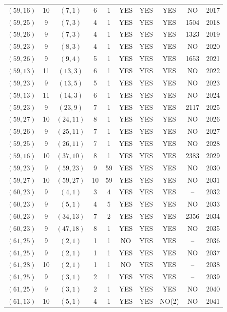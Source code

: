 \begin{longtable}{|c|c|c|c|c|c|c|c|c|c|}
$(59, 16)$ & 10 & $(7, 1)$ & 6 & 1 & YES & YES & YES & NO & 2017\\
$(59, 25)$ & 9 & $(7, 3)$ & 4 & 1 & YES & YES & YES & 1504 & 2018\\
$(59, 26)$ & 9 & $(7, 3)$ & 4 & 1 & YES & YES & YES & 1323 & 2019\\
$(59, 23)$ & 9 & $(8, 3)$ & 4 & 1 & YES & YES & YES & NO & 2020\\
$(59, 26)$ & 9 & $(9, 4)$ & 5 & 1 & YES & YES & YES & 1653 & 2021\\
$(59, 13)$ & 11 & $(13, 3)$ & 6 & 1 & YES & YES & YES & NO & 2022\\
$(59, 23)$ & 9 & $(13, 5)$ & 5 & 1 & YES & YES & YES & NO & 2023\\
$(59, 13)$ & 11 & $(14, 3)$ & 6 & 1 & YES & YES & YES & NO & 2024\\
$(59, 23)$ & 9 & $(23, 9)$ & 7 & 1 & YES & YES & YES & 2117 & 2025\\
$(59, 27)$ & 10 & $(24, 11)$ & 8 & 1 & YES & YES & YES & NO & 2026\\
$(59, 26)$ & 9 & $(25, 11)$ & 7 & 1 & YES & YES & YES & NO & 2027\\
$(59, 25)$ & 9 & $(26, 11)$ & 7 & 1 & YES & YES & YES & NO & 2028\\
$(59, 16)$ & 10 & $(37, 10)$ & 8 & 1 & YES & YES & YES & 2383 & 2029\\
$(59, 23)$ & 9 & $(59, 23)$ & 9 & 59 & YES & YES & YES & NO & 2030\\
$(59, 27)$ & 10 & $(59, 27)$ & 10 & 59 & YES & YES & YES & NO & 2031\\
$(60, 23)$ & 9 & $(4, 1)$ & 3 & 4 & YES & YES & YES & -- & 2032\\
$(60, 23)$ & 9 & $(5, 1)$ & 4 & 5 & YES & YES & YES & NO & 2033\\
$(60, 23)$ & 9 & $(34, 13)$ & 7 & 2 & YES & YES & YES & 2356 & 2034\\
$(60, 23)$ & 9 & $(47, 18)$ & 8 & 1 & YES & YES & YES & NO & 2035\\
$(61, 25)$ & 9 & $(2, 1)$ & 1 & 1 & NO & YES & YES & -- & 2036\\
$(61, 25)$ & 9 & $(2, 1)$ & 1 & 1 & YES & YES & YES & NO & 2037\\
$(61, 28)$ & 10 & $(2, 1)$ & 1 & 1 & NO & YES & YES & -- & 2038\\
$(61, 25)$ & 9 & $(3, 1)$ & 2 & 1 & YES & YES & YES & -- & 2039\\
$(61, 25)$ & 9 & $(3, 1)$ & 2 & 1 & YES & YES & YES & NO & 2040\\
$(61, 13)$ & 10 & $(5, 1)$ & 4 & 1 & YES & YES & NO(2) & NO & 2041\\

\end{longtable}
